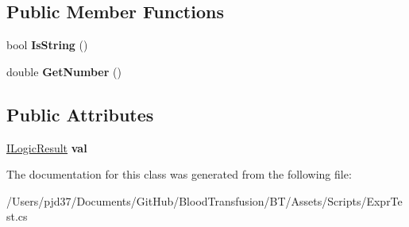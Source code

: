 \subsection*{Public Member Functions}
\begin{DoxyCompactItemize}
\item 
bool {\bfseries Is\+String} ()\hypertarget{class_b83_1_1_logic_expression_parser_1_1_bool_to_number_a30da2f89cd17cddc27b80f1c44cfcfd9}{}\label{class_b83_1_1_logic_expression_parser_1_1_bool_to_number_a30da2f89cd17cddc27b80f1c44cfcfd9}

\item 
double {\bfseries Get\+Number} ()\hypertarget{class_b83_1_1_logic_expression_parser_1_1_bool_to_number_a42ef33a0ea2919f001c6c6d8686c72e4}{}\label{class_b83_1_1_logic_expression_parser_1_1_bool_to_number_a42ef33a0ea2919f001c6c6d8686c72e4}

\end{DoxyCompactItemize}
\subsection*{Public Attributes}
\begin{DoxyCompactItemize}
\item 
\hyperlink{interface_b83_1_1_logic_expression_parser_1_1_i_logic_result}{I\+Logic\+Result} {\bfseries val}\hypertarget{class_b83_1_1_logic_expression_parser_1_1_bool_to_number_ac92de1d55cc5a359946315fc1d455c66}{}\label{class_b83_1_1_logic_expression_parser_1_1_bool_to_number_ac92de1d55cc5a359946315fc1d455c66}

\end{DoxyCompactItemize}


The documentation for this class was generated from the following file\+:\begin{DoxyCompactItemize}
\item 
/\+Users/pjd37/\+Documents/\+Git\+Hub/\+Blood\+Transfusion/\+B\+T/\+Assets/\+Scripts/Expr\+Test.\+cs\end{DoxyCompactItemize}
